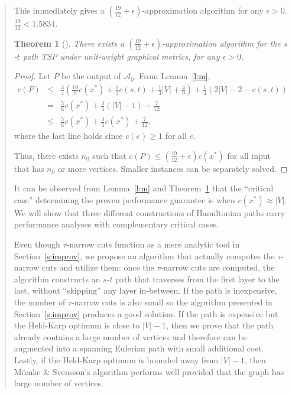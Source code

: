 \documentclass[11pt,letterpaper]{article}
\newtheorem{thm}{Theorem}
\newcommand{\st}{\mbox{$s$-$t$} }
\begin{document}
\begin{quote}
This immediately gives a $(\frac{19}{12}+\epsilon)$-approximation algorithm for any $\epsilon>0$. $\frac{19}{12}<1.5834$.
\begin{thm}[\cite{M}]\label{t:m}
There exists a $(\frac{19}{12}+\epsilon)$-approximation algorithm for the \st path TSP under unit-weight graphical metrics, for any $\epsilon>0$.
\end{thm}
\begin{proof}
Let $P$ be the output of $\mathscr{A}_{0}$. From Lemma~\ref{l:m},\begin{eqnarray*}
c(P) &\leq& \frac{3}{4} \left( \frac{10}{9}c(x^*)+\frac{1}{3}c(s,t)+\frac{1}{3}|V|+\frac{4}{9} \right) + \frac{1}{4} \left( 2|V|-2-c(s,t) \right)\\
&=& \frac{5}{6}c(x^*)+\frac{3}{4}(|V|-1)+\frac{7}{12}\\
&\leq& \frac{5}{6}c(x^*)+\frac{3}{4}c(x^*)+\frac{7}{12},
\end{eqnarray*}where the last line holds since $c(e)\geq 1$ for all $e$.

Thus, there exists $n_0$ such that $c(P)\leq (\frac{19}{12}+\epsilon)c(x^*)$ for all input that has $n_0$ or more vertices. Smaller instances can be separately solved.
\end{proof}

It can be observed from Lemma~\ref{l:m} and Theorem~\ref{t:m} that the ``critical case'' determining the proven performance guarantee is when $c(x^*)\approx |V|$. We will show that three different constructions of Hamiltonian paths carry performance analyses with complementary critical cases.

Even though $\tau$-narrow cuts function as a mere analytic tool in Section~\ref{s:improv}, we propose an algorithm that actually computes the $\tau$-narrow cuts and utilize them: once the $\tau$-narrow cuts are computed, the algorithm constructs an \st path that traverses from the first layer to the last, without ``skipping'' any layer in-between. If the path is inexpensive, the number of $\tau$-narrow cuts is also small so the algorithm presented in Section~\ref{s:improv} produces a good solution. If the path is expensive but the Held-Karp optimum is close to $|V|-1$, then we prove that the path already contains a large number of vertices and therefore can be augmented into a spanning Eulerian path with small additional cost. Lastly, if the Held-Karp optimum is bounded away from $|V|-1$, then M\"omke \& Svensson's algorithm performs well provided that the graph has large number of vertices.


\end{quote}
\end{document}
